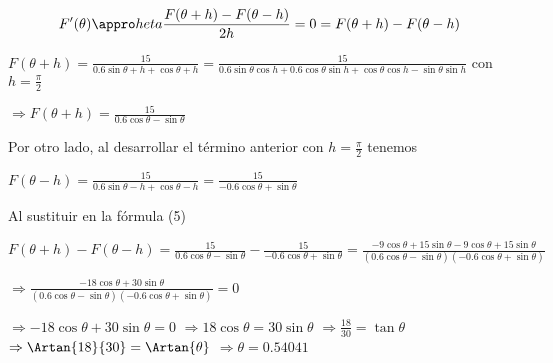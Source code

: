 \begin{equation}
 F'(\theta) \appro	heta\frac{F(\theta+h)-F(\theta-h)}{2h} = 0 = F(\theta+h)-F(\theta-h)
\end{equation}

$F(\theta+h) = \frac{15}{0.6\sin{\theta+h}+\cos{\theta+h}} = \frac{15}{0.6\sin{\theta}\cos{h}+0.6\cos{\theta}\sin{h}+\cos{\theta}\cos{h}-\sin{\theta}\sin{h}} $
con $h = \frac{\pi}{2}$ 

$\Rightarrow F(\theta+h) = \frac{15}{0.6\cos{\theta}-\sin{\theta}}$

Por otro lado, al desarrollar el término anterior con $h = \frac{\pi}{2}$  tenemos

$F(\theta-h) = \frac{15}{0.6\sin{\theta-h}+\cos{\theta-h}} =  \frac{15}{-0.6\cos{\theta}+\sin{\theta}}$

Al sustituir en la fórmula (5)

$F(\theta+h)-F(\theta-h) = \frac{15}{0.6\cos{\theta}-\sin{\theta}} - \frac{15}{-0.6\cos{\theta}+\sin{\theta}} = \frac{-9\cos{\theta}+15\sin{\theta}-9\cos{\theta}+15\sin{\theta}}
{(0.6\cos{\theta}-\sin{\theta})(-0.6\cos{\theta}+\sin{\theta})} $

$\Rightarrow \frac{-18\cos{\theta}+30\sin{\theta}}
{(0.6\cos{\theta}-\sin{\theta})(-0.6\cos{\theta}+\sin{\theta})} = 0$ 

$\Rightarrow -18\cos{\theta}+30\sin{\theta} = 0$ $\Rightarrow 18\cos{\theta} = 30\sin{\theta} $ $\Rightarrow \frac{18}{30} = \tan{\theta} $ $\Rightarrow \Artan{18}{30} = \Artan{\theta} $ $\Rightarrow  \theta= 0.54041 $